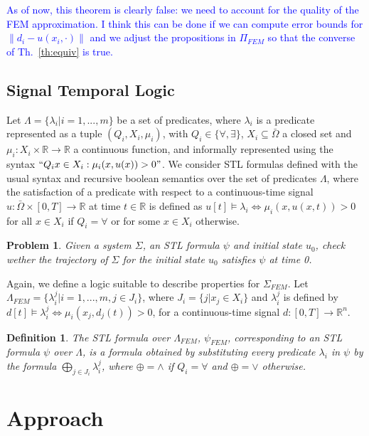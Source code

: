 \documentclass{article}
\newtheorem{definition}{Definition}
\newtheorem{problem}{Problem}
\newcommand*{\R}{\mathbb{R}}
\newcommand*{\fran}[1]{\textcolor{blue}{#1}}
\begin{document}
\fran{As of now, this theorem is clearly false: we need to account for the
quality of the FEM approximation. I think this can be done if 
we can compute error bounds for $\|d_i - u(x_i, \cdot)\|$ and we adjust the
propositions in $\Pi_{FEM}$ so that the converse of Th.~\ref{th:equiv} is true.}

\subsection{Signal Temporal Logic}
\label{sub:signal_temporal_logic}

Let $\Lambda = \{\lambda_i | i = 1,...,m\}$ be a set of predicates, where
$\lambda_i$ is a predicate represented as a tuple $(Q_i, X_i, \mu_i)$, with $Q_i
\in \{\forall, \exists\}$, $X_i
\subseteq \bar\Omega$ a closed set and $\mu_i : X_i \times \R \to \R$ a continuous function,
and informally represented using the syntax $``Q_i x \in X_i : \mu_i(x, u(x)) >
0"$. We consider STL formulas defined with the usual syntax and recursive boolean
semantics over the set of predicates $\Lambda$, where the satisfaction of a
predicate with respect to a continuous-time signal $u : \bar\Omega \times [0, T]
\to \R$ at time $t \in \R$ is defined as $u[t] \models \lambda_i \iff 
\mu_i(x, u(x, t)) > 0$ for all $x \in X_i$ if $Q_i = \forall$ or for some $x \in
X_i$ otherwise.

\begin{problem}
    Given a system $\Sigma$, an STL formula $\psi$ and initial state $u_0$,
    check wether the trajectory of $\Sigma$ for the initial state $u_0$
    satisfies $\psi$ at time 0.
\end{problem}

Again, we define a logic suitable to describe properties for $\Sigma_{FEM}$. Let
$\Lambda_{FEM} = \{\lambda_i^j | i = 1,...,m, j \in J_i\}$, where $J_i= \{j |
x_j \in X_i\}$ and $\lambda_i^j$ is defined by $d[t] \models \lambda_i^j \iff
\mu_i(x_j, d_j(t)) > 0$, for a continuous-time signal $d : [0, T] \to \R^n$.

\begin{definition}
    The STL formula over $\Lambda_{FEM}$, $\psi_{FEM}$, corresponding to an STL
    formula $\psi$ over $\Lambda$, is a formula obtained by substituting every
    predicate $\lambda_i$ in $\psi$ by the formula $\bigoplus_{j \in J_i}
    \lambda_i^j$, where $\oplus = \wedge$ if $Q_i = \forall$ and $\oplus = \vee$
    otherwise.
\end{definition}

\section{Approach}
\end{document}
